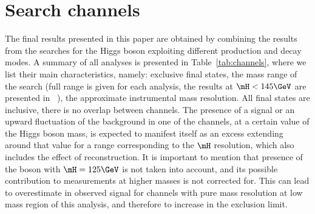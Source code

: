 \section{Search channels}
\label{sec:analyses}

The final results presented in this paper are obtained by combining 
the results from the searches for the Higgs boson
exploiting different production and decay modes. 
A summary of all analyses 
is presented in Table~\ref{tab:channels}, where we list their main characteristics, namely:
exclusive final states,
the mass range of the search (full range is given for each analysis, 
the results at $\mH < 145\GeV$ are presented in ~\cite{CMSobservation125}),
the approximate instrumental mass resolution.
All final states are inclusive, there is no overlap between channels.
The presence of a signal or an upward fluctuation of the background in one of the channels, 
at a certain value of the Higgs boson mass, is expected to manifest itself as an excess 
extending around that value for a range corresponding to the $\mH$ resolution, which 
also includes the effect of reconstruction.
It is important to mention that presence of the boson with $\mH = 125\GeV$ is not
taken into account, and its possible contribution to measurements at higher masses
is not corrected for. This can lead to overestimate in observed signal for
channels with pure mass resolution at low mass region of this analysis, and therefore
to increase in the exclusion limit.

